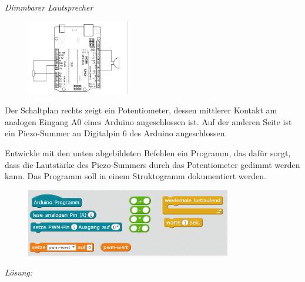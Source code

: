 \documentclass[ngerman, 11pt]{scrreprt}
\begin{document}
	\begin{aufgabe} \emph{Dimmbarer Lautsprecher}
		
		\begin{figure}
			\centering
			\vspace{-1\baselineskip}
			\includegraphics[width=0.4\textwidth]{../Zeichnungen/schaltplan-dimmbarer-lautsprecher.png}
		\end{figure}
		Der Schaltplan rechts zeigt ein Potentiometer, dessen mittlerer Kontakt am analogen Eingang A0 eines Arduino angeschlossen ist. Auf der anderen Seite ist ein Piezo-Summer an Digitalpin 6 des Arduino angeschlossen.
		
		Entwickle mit den unten abgebildeten Befehlen ein Programm, das dafür sorgt, dass die Lautstärke des Piezo-Summers durch das Potentiometer gedimmt werden kann. Das Programm soll in einem Struktogramm dokumentiert werden.
		
		\begin{figure}[H]
			\centering
			\includegraphics[width=0.8\textwidth]{../pics/befehle-fuer-dimmbaren-lautsprecher.png}
		\end{figure}
	\end{aufgabe}
	
	\bigskip
	\emph{Lösung:}
	
	
\end{document}
